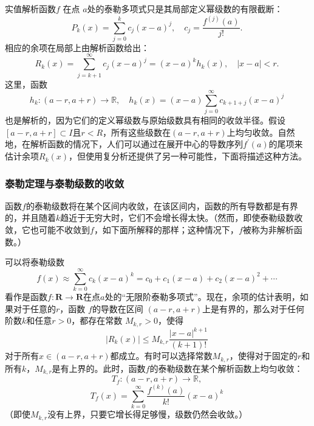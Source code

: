 实值解析函数\( f \) 在点 \( a \)处的泰勒多项式只是其局部定义幂级数的有限截断：
\[
P_k(x) = \sum_{j=0}^{k} c_j (x - a)^j, \quad c_j = \frac{f^{(j)}(a)}{j!}.~
\]
相应的余项在局部上由解析函数给出：
\[
R_k(x) = \sum_{j=k+1}^{\infty} c_j (x - a)^j = (x - a)^k h_k(x), \quad |x - a| < r.~
\]
这里，函数
\[
h_k : (a - r, a + r) \to \mathbb{R}, \quad h_k(x) = (x - a) \sum_{j=0}^{\infty} c_{k+1+j} (x - a)^j~
\]
也是解析的，因为它们的定义幂级数与原始级数具有相同的收敛半径。假设\( [a - r, a + r] \subset I \)且\( r < R \)，所有这些级数在\( (a - r, a + r) \)上均匀收敛。自然地，在解析函数的情况下，人们可以通过在展开中心的导数序列\( f^{'}(a) \)的尾项来估计余项\( R_k(x) \)，但使用复分析还提供了另一种可能性，下面将描述这种方法。
\subsubsection{泰勒定理与泰勒级数的收敛}  
函数\( f \)的泰勒级数将在某个区间内收敛，在该区间内，函数的所有导数都是有界的，并且随着\( k \)趋近于无穷大时，它们不会增长得太快。（然而，即使泰勒级数收敛，它也可能不收敛到\( f \)，如下面所解释的那样；这种情况下，\( f \)被称为非解析函数。）

可以将泰勒级数
\[
f(x) \approx \sum_{k=0}^{\infty} c_k (x - a)^k = c_0 + c_1 (x - a) + c_2 (x - a)^2 + \cdots~
\]
看作是函数\( f : \mathbf{R} \to \mathbf{R} \)在点\( a \)处的“无限阶泰勒多项式”。现在，余项的估计表明，如果对于任意的\( r \)，函数 \( f \)的导数在区间 \( (a - r, a + r) \)上是有界的，那么对于任何阶数\( k \)和任意\( r > 0 \)，都存在常数 \( M_{k,r} > 0 \)，使得
\[
|R_k(x)| \leq M_{k,r} \frac{|x - a|^{k+1}}{(k+1)!}~
\]
对于所有\( x \in (a - r, a + r) \)都成立。有时可以选择常数\( M_{k,r} \)，使得对于固定的\( r \)和所有\( k \)，\( M_{k,r} \)是有上界的。此时，函数\( f \)的泰勒级数在某个解析函数上均匀收敛：
\[
T_f : (a - r, a + r) \to \mathbb{R},~
\]
\[
T_f(x) = \sum_{k=0}^{\infty} \frac{f^{(k)}(a)}{k!} (x - a)^k~
\]
（即使\( M_{k,r} \)没有上界，只要它增长得足够慢，级数仍然会收敛。）

